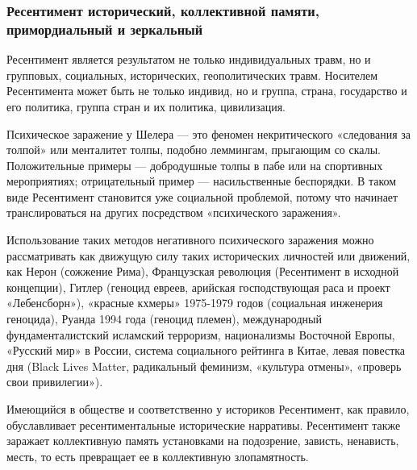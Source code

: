  
 
 
 
 

\subsubsection{Ресентимент исторический, коллективной памяти, примордиальный и зеркальный}

Ресентимент является результатом не только индивидуальных травм, но и
групповых, социальных, исторических, геополитических травм. Носителем
Ресентимента может быть не только индивид, но и группа, страна, государство и
его политика, группа стран и их политика, цивилизация.

Психическое заражение у Шелера — это феномен некритического «следования за
толпой» или менталитет толпы, подобно леммингам, прыгающим со скалы.
Положительные примеры — добродушные толпы в пабе или на спортивных
мероприятиях; отрицательный пример — насильственные беспорядки. В таком виде
Ресентимент становится уже социальной проблемой, потому что начинает
транслироваться на других посредством «психического заражения».

Использование таких методов негативного психического заражения можно
рассматривать как движущую силу таких исторических личностей или движений, как
Нерон (сожжение Рима), Французская революция (Ресентимент в исходной
концепции), Гитлер (геноцид евреев, арийская господствующая раса и проект
«Лебенсборн»), «красные кхмеры» 1975-1979 годов (социальная инженерия
геноцида), Руанда 1994 года (геноцид племен), международный фундаменталистский
исламский терроризм, национализмы Восточной Европы, «Русский мир» в России,
система социального рейтинга в Китае, левая повестка дня (Black Lives Matter,
радикальный феминизм, «культура отмены», «проверь свои привилегии»).

Имеющийся в обществе и соответственно у историков Ресентимент, как правило,
обуславливает ресентиментальные исторические нарративы. Ресентимент также
заражает коллективную память установками на подозрение, зависть, ненависть,
месть, то есть превращает ее в коллективную злопамятность.

